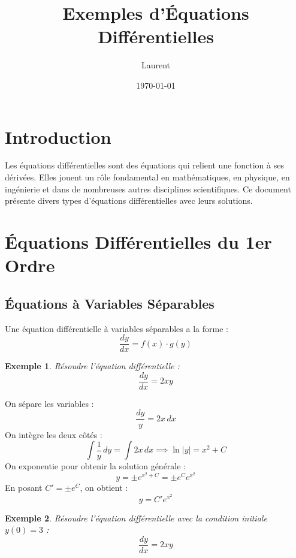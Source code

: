 \documentclass[12pt]{article}
\title{Exemples d'Équations Différentielles}
\author{Laurent}
\date{\today}
\newtheorem{example}{Exemple}[section]
\begin{document}
\maketitle

\tableofcontents

\newpage

\section{Introduction}
Les équations différentielles sont des équations qui relient une fonction à ses dérivées. Elles jouent un rôle fondamental en mathématiques, en physique, en ingénierie et dans de nombreuses autres disciplines scientifiques. Ce document présente divers types d'équations différentielles avec leurs solutions.

\section{Équations Différentielles du 1er Ordre}

\subsection{Équations à Variables Séparables}
\begin{myequation}
Une équation différentielle à variables séparables a la forme :
\[
\frac{dy}{dx} = f(x) \cdot g(y)
\]
\end{myequation}

\begin{example}
Résoudre l'équation différentielle :
\[
\frac{dy}{dx} = 2xy
\]
\end{example}

\begin{mybox}[Solution]
On sépare les variables :
\[
\frac{dy}{y} = 2x \, dx
\]
On intègre les deux côtés :
\[
\int \frac{1}{y} \, dy = \int 2x \, dx \implies \ln|y| = x^2 + C
\]
On exponentie pour obtenir la solution générale :
\[
y = \pm e^{x^2 + C} = \pm e^C e^{x^2}
\]
En posant $C' = \pm e^C$, on obtient :
\[
\boxed{y = C' e^{x^2}}
\]
\end{mybox}

\begin{example}
Résoudre l'équation différentielle avec la condition initiale $y(0) = 3$ :
\[
\frac{dy}{dx} = 2xy
\]
\end{example}
\end{document}
